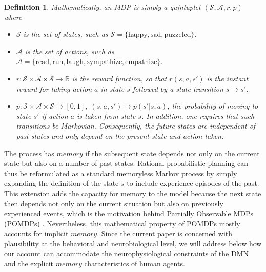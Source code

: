 \documentclass[10pt,letterpaper]{article}
\newtheorem*{definition*}{Definition}
\begin{document}
\begin{definition*}
Mathematically, an MDP is simply a quintuplet $(\mathcal S, \mathcal A, r, p)$ where
\begin{itemize}
\item $\mathcal S$ is the set of states, such as $\mathcal S = \{\text{happy}, \text{sad}, \text{puzzeled}\}$.
\item $\mathcal A$ is the set of actions, such as $\mathcal A = \{\text{read}, \text{run},
  \text{laugh}, \text{sympathize}, \text{empathize}\}.$
\item $r : \mathcal S \times \mathcal A \times \mathcal S \rightarrow \mathbb R$ is the \textit{reward function},
   so that $r(s, a, s')$ is the instant reward for taking action $a$ in state $s$ followed by a state-transition $s \rightarrow s'$.
\item $p : \mathcal S \times \mathcal A \times \mathcal S \rightarrow [0, 1],\; (s,a,s') \mapsto p(s'|s,a)$,
  the probability of moving to state $s'$ if action $a$ is taken from state $s$. In addition, one requires that such
  transitions be Markovian. Consequently, the future states are independent of past states and only depend on the present state and action taken.
\end{itemize}
\end{definition*}

The process has $memory$ if the subsequent state depends not only on the current state but also on a number of past states. Rational probabilistic planning can thus be reformulated as a standard memoryless Markov process by simply expanding the definition of the state $s$ to include experience episodes of the past. This extension adds the capacity for memory to the model because the next state then depends not only on the current situation but also on previously experienced events, which is the motivation behind Partially Observable MDPs (POMDPs)
\citep{starkweather2017dopamine,o2006making}.
Nevertheless, this mathematical property of POMDPs mostly accounts for implicit $memory$. Since the current paper is concerned with plausibility at the behavioral and neurobiological level, we will address below how our account can accommodate the neurophysiological constraints of the DMN and the explicit $memory$ characteristics of human agents.
\end{document}
